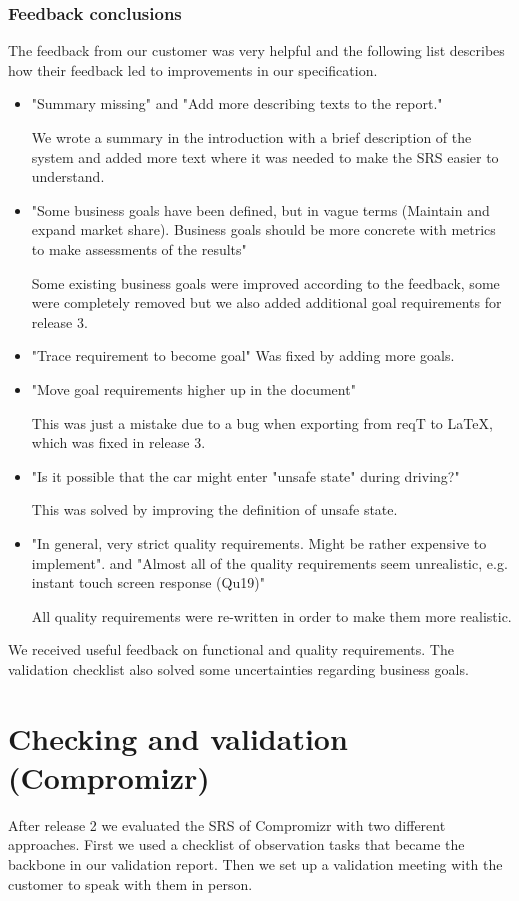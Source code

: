 \documentclass[10pt]{article}
\begin{document}
\subsubsection{Feedback conclusions}
The feedback from our customer was very helpful and the following list describes how their feedback led to improvements in our specification.
\begin{itemize}
\item "Summary missing" and "Add more describing texts to the report." 

We wrote a summary in the introduction with a brief description of the system and added more text where it was needed to make the SRS easier to understand.
\item "Some business goals have been defined, but in vague terms (Maintain and expand market share). Business goals should be more concrete with metrics to make assessments of the results"

Some existing business goals were improved according to the feedback, some were completely removed but we also added additional goal requirements for release 3.
\item "Trace requirement to become goal" Was fixed by adding more goals.
\item "Move goal requirements higher up in the document" 

This was just a mistake due to a bug when exporting from reqT to LaTeX, which was fixed in release 3.
\item "Is it possible that the car might enter "unsafe state" during driving?" 

This was solved by improving the definition of unsafe state.
\item "In general, very strict quality requirements. Might be rather expensive to implement". and "Almost all of the quality requirements seem unrealistic, e.g. instant touch screen response (Qu19)"

All quality requirements were re-written in order to make them more realistic.
\end{itemize}

\noindent We received useful feedback on functional and quality requirements. The validation checklist also solved some uncertainties regarding business goals.

\section{Checking and validation (Compromizr)}
After release 2 we evaluated the SRS of Compromizr with two different approaches. First we used a checklist of observation tasks that became the backbone in our validation report. Then we set up a validation meeting with the customer to speak with them in person.
\end{document}

